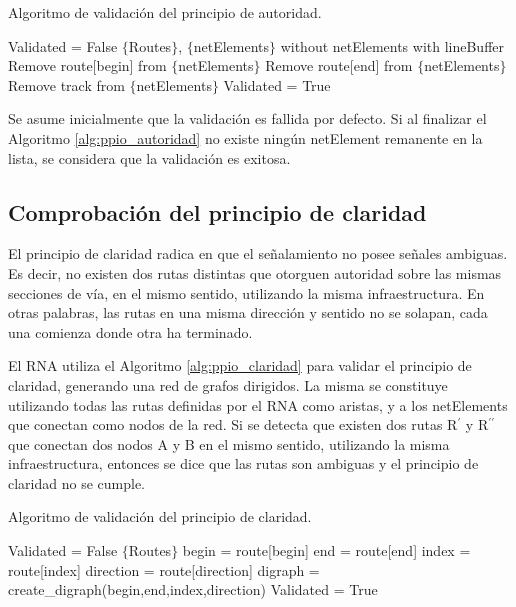 		\begin{algorithm}[H]
			\caption{Algoritmo de validación del principio de autoridad.}\label{alg:ppio_autoridad}
			\DontPrintSemicolon
			\SetNoFillComment
			\LinesNotNumbered 
			Validated = False\;
			$\{$Routes$\}$, $\{$netElements$\}$ without netElements with lineBuffer\; 
			{
				{
					Remove route[begin] from $\{$netElements$\}$\; 
				}
				{
					Remove route[end] from $\{$netElements$\}$\; 
				}
				{
					{
						Remove track from $\{$netElements$\}$\; 
					} 
				}
			}
			{
				Validated = True\; 
			} 
		\end{algorithm}
		
		Se asume inicialmente que la validación es fallida por defecto. Si al finalizar el Algoritmo \ref{alg:ppio_autoridad} no existe ningún netElement remanente en la lista, se considera que la validación es exitosa.	
			
	\subsection{Comprobación del principio de claridad}
		
		El principio de claridad radica en que el señalamiento no posee señales ambiguas. Es decir, no existen dos rutas distintas que otorguen autoridad sobre las mismas secciones de vía, en el mismo sentido, utilizando la misma infraestructura. En otras palabras, las rutas en una misma dirección y sentido no se solapan, cada una comienza donde otra ha terminado.
		
		El RNA utiliza el Algoritmo \ref{alg:ppio_claridad} para validar el principio de claridad, generando una red de grafos dirigidos. La misma se constituye utilizando todas las rutas definidas por el RNA como aristas, y a los netElements que conectan como nodos de la red. Si se detecta que existen dos rutas R$^{\prime}$ y R$^{\prime\prime}$ que conectan dos nodos A y B en el mismo sentido, utilizando la misma infraestructura, entonces se dice que las rutas son ambiguas y el principio de claridad no se cumple.
		
		\begin{algorithm}[H]
			\caption{Algoritmo de validación del principio de claridad.}\label{alg:ppio_claridad}
			\DontPrintSemicolon
			\SetNoFillComment
			\LinesNotNumbered 
			Validated = False\;
			$\{$Routes$\}$\; 
			{
				begin = route[begin]\;
				end = route[end]\;
				index = route[index] \;
				direction = route[direction]\;
				digraph = create\_digraph(begin,end,index,direction)\;	
			}
			{
				Validated = True\;
			}
		\end{algorithm}
		
